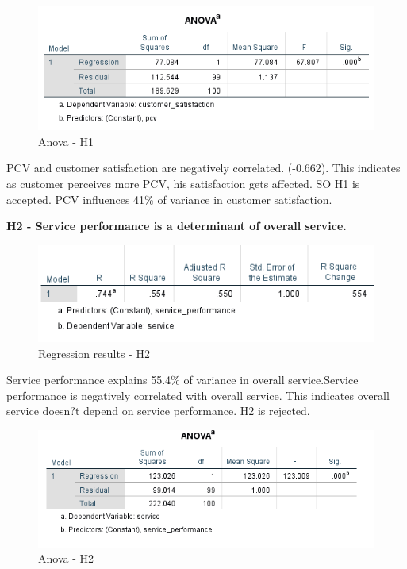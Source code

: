 \documentclass[a4paper, 14pt]{extarticle}
\begin{document}
{\begin{figure}[H]
\centering
\includegraphics[scale=1]{anova_pcv_cs.png}
\caption{Anova - H1}
\end{figure}

PCV and customer satisfaction are negatively correlated. (-0.662). This indicates as customer perceives more PCV, his satisfaction gets affected. SO H1 is accepted.
PCV influences 41\% of variance in customer satisfaction.\\

\par \textbf{H2 - Service performance is a determinant of overall service.}\\
\begin{figure}[H]
\centering
\includegraphics[scale=1]{service_performance_vs_service.png}
\caption{Regression results - H2}
\end{figure}

Service performance explains 55.4\% of variance in overall service.Service performance is negatively correlated with overall service. This indicates overall service doesn?t depend on service performance. H2 is rejected.

\begin{figure}[H]
\centering
\includegraphics[scale=1]{anova_s_sp.png}
\caption{Anova - H2}
\end{figure}

}
\end{document}
